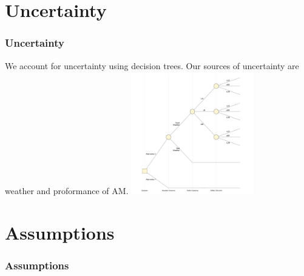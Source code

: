 \documentclass{beamer}
\begin{document}
\section{Uncertainty}
\begin{frame}
  \frametitle{Uncertainty}
  We account for uncertainty using decision trees.  Our sources of
  uncertainty are weather and proformance of AM.
  \centering
  \includegraphics[width=0.4\textwidth]{../../R/decisiontree}
\end{frame}

\section{Assumptions}
\begin{frame}
  \frametitle{Assumptions}
\end{frame}
\end{document}
